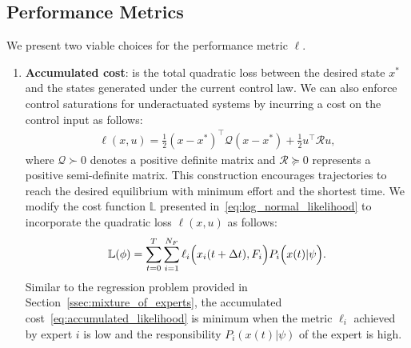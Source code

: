 \subsection{Performance Metrics}
\label{ssec:performance_objective}
%
We present two viable choices for the performance metric $\ell$. 
\begin{enumerate}
    \item \textbf{Accumulated cost}: is the total quadratic loss between the
    desired state $x^*$ and the states generated under the current control law.
    We can also enforce control saturations for underactuated systems by incurring a
    cost on the control input as follows:
    \begin{equation}
        \begin{gathered}
            \ell(x, u) = \frac{1}{2}(x - x^*)^\top \mathcal{Q} (x - x^*) + \frac{1}{2} u^\top \mathcal{R} u , 
        \end{gathered}
    \label{eq:accumulatedLoss}
    \end{equation}
    \noindent where $\mathcal{Q} \succ 0$ denotes a positive definite matrix and
    $\mathcal{R} \succeq 0$ represents a positive semi-definite matrix.
    This construction encourages trajectories to reach the desired equilibrium
    with minimum effort and the shortest time.
    We modify the cost function $\mathbb{L}$ presented
    in~\eqref{eq:log_normal_likelihood} to incorporate the quadratic loss
    $\ell(x, u)$ as follows:
    \begin{align}
        \mathbb{L}(\phi) = \sum_{t=0}^{T} \sum_{i=1}^{N_F} \ell_i \Bigl(x_i(t+\Delta t), F_i \Bigr) P_i\Bigl(x(t) | \psi \Bigr)  .
        \label{eq:accumulated_likelihood}
    \end{align}
    Similar to the regression problem provided in
    Section~\ref{ssec:mixture_of_experts}, the accumulated
    cost~\eqref{eq:accumulated_likelihood} is minimum when the metric $\ell_i$
    achieved by expert $i$ is low and the responsibility $P_i(x(t) | \psi)$ of
    the expert is high.


\end{enumerate}
